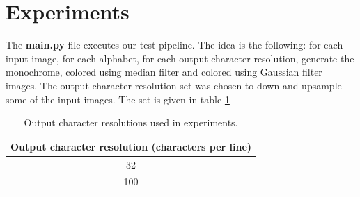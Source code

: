 \documentclass[]{IEEEtran}
\begin{document}




\section{Experiments}
The \textbf{main.py} file executes our test pipeline. The idea is the following: for each input image, for each alphabet, for each output character resolution, generate the monochrome, colored using median filter and colored using Gaussian filter images.
The output character resolution set was chosen to down and upsample some of the input images. The set is given in table \ref{table:resolutions}

\begin{table}[H]
\centering
\begin{center}
\begin{tabular}{ |c| } 
 \hline
 Output character resolution (characters per line)\\
 \hline
 32 \\ 
 \hline
 100  \\
 \hline
\end{tabular}
 \label{table:resolutions}
 \caption{Output character resolutions used in experiments.}
\end{center}
\end{table}
\end{document}
